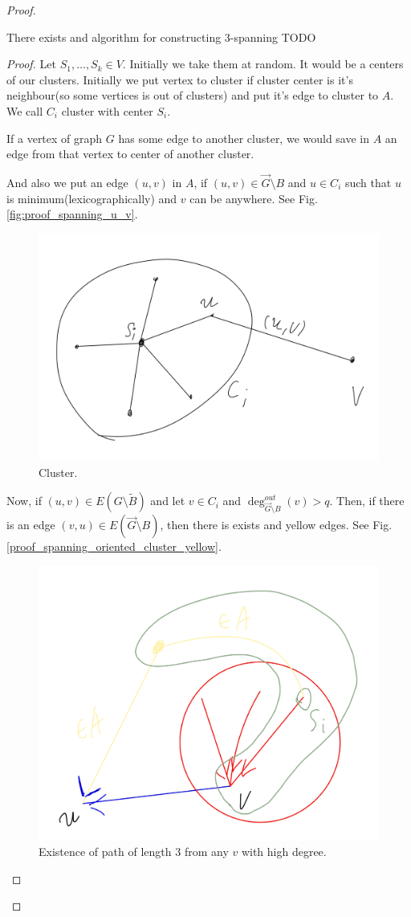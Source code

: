 \begin{proof}
	\begin{lm}[Alg1] \label{lm:spanning_alg_1}
	  There exists and algorithm for constructing 3-spanning TODO
	\end{lm}
	\begin{proof}
	  
  Let $S_1, \ldots, S_k \in V$. Initially we take them at random.
  It would be a centers of our clusters. Initially we put vertex to cluster if cluster center is it's neighbour(so some vertices is out of clusters) and put it's edge to cluster to $A$.
  We call $C_i$ cluster with center $S_i$.

  If a vertex of graph $G$ has some edge to another cluster, we would save in $A$ an edge from that vertex to center of another cluster.

  And also we put an edge $(u, v)$ in $A$, if $(u, v) \in \vec G \setminus B$ and $u \in C_i$ such that $u$ is minimum(lexicographically) and $v$ can be anywhere.  See Fig. \eqref{fig:proof_spanning_u_v}.

  \begin{figure}[H]
  	\centering
  	\includegraphics[width=0.5\linewidth]{figures/proof_spanning_u_v.jpeg}
  	\caption{Cluster.}
  	\label{fig:proof_spanning_u_v}
  \end{figure}

  Now, if $(u, v) \in E(G \setminus \tilde B)$ and let $v \in C_i$ and $\deg^{out}_{\vec G \setminus B}(v) > q$.
  Then, if there is an edge $(v, u) \in E(\vec G \setminus B)$, then there is exists and yellow edges.
  See Fig. \ref{proof_spanning_oriented_cluster_yellow}.

  \begin{figure}[H]
  	\centering
  	\includegraphics[width=0.5\linewidth]{figures/proof_spanning_oriented_cluster_yellow.jpeg}
  	\caption{Existence of path of length 3 from any $v$ with high degree.}
  	\label{fig:proof_spanning_oriented_cluster_yellow}
  \end{figure}


\end{proof}
\end{proof}
